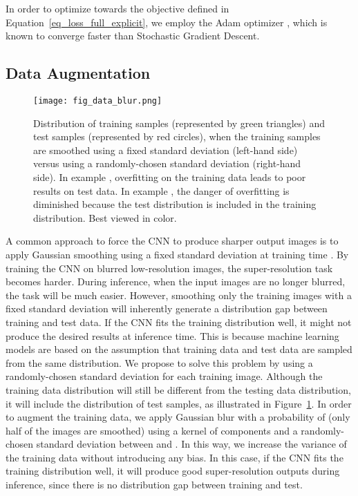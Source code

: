 \documentclass{ieeeaccess}
\begin{document}
In order to optimize towards the objective defined in Equation~\eqref{eq_loss_full_explicit}, we employ the Adam optimizer \cite{Kingma-ICLR-2015}, which is known to converge faster than Stochastic Gradient Descent.

\subsection{Data Augmentation}

\begin{figure}[t!]
\centering
\texttt{[image: fig\_data\_blur.png]}
\caption{Distribution of training samples (represented by green triangles) and test samples (represented by red circles), when the training samples are smoothed using a fixed standard deviation (left-hand side) versus using a randomly-chosen standard deviation (right-hand side). In example , overfitting on the training data leads to poor results on test data. In example , the danger of overfitting is diminished because the test distribution is included in the training distribution. Best viewed in color.}
\label{fig_data_blur}
\end{figure}

A common approach to force the CNN to produce sharper output images is to apply Gaussian smoothing using a fixed standard deviation at training time \cite{Du-AS-2019, Shi-JBHI-2018, ZENG-CBM-2018}. By training the CNN on blurred low-resolution images, the super-resolution task becomes harder. During inference, when the input images are no longer blurred, the task will be much easier. However, smoothing only the training images with a fixed standard deviation will inherently generate a distribution gap between training and test data. If the CNN fits the training distribution well, it might not produce the desired results at inference time. This is because machine learning models are based on the assumption that training data and test data are sampled from the same distribution. We propose to solve this problem by using a randomly-chosen standard deviation for each training image. Although the training data distribution will still be different from the testing data distribution, it will include the distribution of test samples, as illustrated in Figure~\ref{fig_data_blur}.  In order to augment the training data, we apply Gaussian blur with a probability of  (only half of the images are smoothed) using a kernel of  components and a randomly-chosen standard deviation between  and . In this way, we increase the variance of the training data without introducing any bias. In this case, if the CNN fits the training distribution well, it will produce good super-resolution outputs during inference, since there is no distribution gap between training and test.
\end{document}
